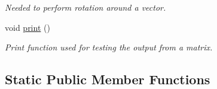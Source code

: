 \begin{DoxyCompactItemize}
\begin{DoxyCompactList}\small\item\em Needed to perform rotation around a vector. \end{DoxyCompactList}\item 
\mbox{\label{class_matrix4_a4daa9a348759a3331fbad171c0712974}} 
void \mbox{\hyperlink{class_matrix4_a4daa9a348759a3331fbad171c0712974}{print}} ()
\begin{DoxyCompactList}\small\item\em Print function used for testing the output from a matrix. \end{DoxyCompactList}\end{DoxyCompactItemize}
\subsection*{Static Public Member Functions}

